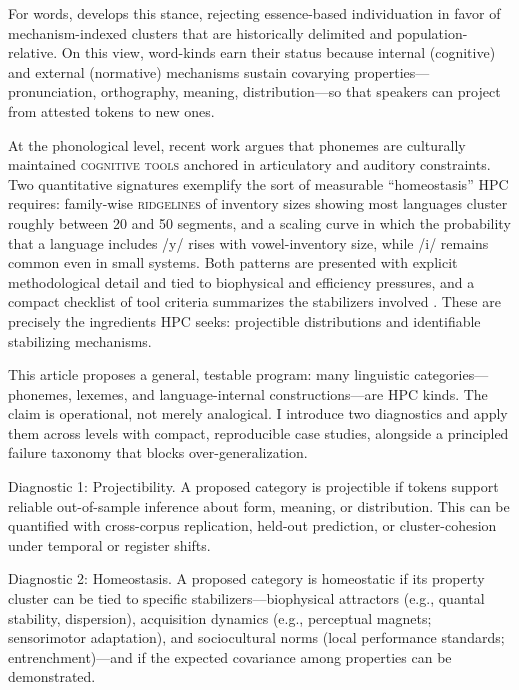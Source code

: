 \documentclass[12pt]{article}
\begin{document}
For words, \citet{Miller2021WordsSpeciesKinds} develops this stance, rejecting essence-based individuation in favor of mechanism-indexed clusters that are historically delimited and population-relative. On this view, word-kinds earn their status because internal (cognitive) and external (normative) mechanisms sustain covarying properties---pronunciation, orthography, meaning, distribution---so that speakers can project from attested tokens to new ones.


At the phonological level, recent work argues that phonemes are culturally maintained \textsc{cognitive tools} anchored in articulatory and auditory constraints. Two quantitative signatures exemplify the sort of measurable ``homeostasis'' HPC requires: family-wise \textsc{ridgelines} of inventory sizes showing most languages cluster roughly between 20 and 50 segments, and a scaling curve in which the probability that a language includes /y/ rises with vowel-inventory size, while /i/ remains common even in small systems. Both patterns are presented with explicit methodological detail and tied to biophysical and efficiency pressures, and a compact checklist of tool criteria summarizes the stabilizers involved \citep[Fig.\,1 p.\,4; Fig.\,2 p.\,7; Table\,1 p.\,14]{Ekstrom2025PhonemeTool}. These are precisely the ingredients HPC seeks: projectible distributions and identifiable stabilizing mechanisms.

This article proposes a general, testable program: many linguistic categories---phonemes, lexemes, and language-internal constructions---are HPC kinds. The claim is operational, not merely analogical. I introduce two diagnostics and apply them across levels with compact, reproducible case studies, alongside a principled failure taxonomy that blocks over-generalization.

Diagnostic 1: Projectibility. A proposed category is projectible if tokens support reliable out-of-sample inference about form, meaning, or distribution. This can be quantified with cross-corpus replication, held-out prediction, or cluster-cohesion under temporal or register shifts.

Diagnostic 2: Homeostasis. A proposed category is homeostatic if its property cluster can be tied to specific stabilizers---biophysical attractors (e.g., quantal stability, dispersion), acquisition dynamics (e.g., perceptual magnets; sensorimotor adaptation), and sociocultural norms (local performance standards; entrenchment)---and if the expected covariance among properties can be demonstrated.
\end{document}
